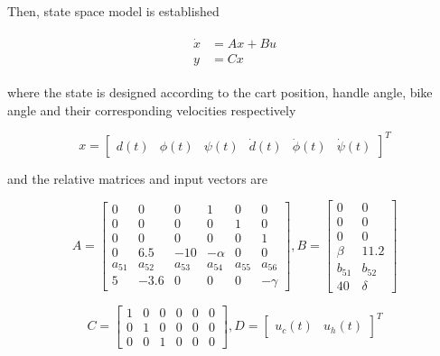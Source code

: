 \documentclass[hyperref]{article}
\theoremstyle{nonumberplain}
\begin{document}
	Then, state space model is established
	
	\begin{equation}
	\begin{split}
	\begin{aligned}
		\dot{x}&=Ax+Bu \\
		y&=Cx
	\label{eq1}
	\end{aligned}
	\end{split}
	\end{equation}
	
	where the state is designed according to the cart position, handle angle, bike angle and their corresponding velocities respectively
	
	\begin{equation}
		x=\begin{bmatrix}
		d(t) & \phi(t) & \psi(t) & \dot{d}(t) & \dot{\phi}(t) & \dot{\psi}(t) 
		\end{bmatrix}^{T}
	\label{eq2}
	\end{equation}
	
	and the relative matrices and input vectors are
	
	\begin{equation}
		A=\begin{bmatrix}
		0 &0  &0  &1  &0  &0 \\ 
		0 &0  &0  &0  &1  &0 \\ 
		0 &0  &0  &0  &0  &1 \\ 
		0 &6.5  &-10  &-\alpha   &0  &0 \\ 
		a_{51} &a_{52}  &a_{53}  &a_{54}  &a_{55}  &a_{56} \\ 
		5 &-3.6  &0  &0  &0  &-\gamma  
		\end{bmatrix}, 
		B=\begin{bmatrix}
		0 &0 \\ 
		0 &0 \\ 
		0 &0 \\ 
		\beta  &11.2 \\ 
		b_{51} &b_{52} \\ 
		40 &\delta  
		\end{bmatrix}
	\label{eq3}
	\end{equation}
	
	\begin{equation}
		C=\begin{bmatrix}
		1 &0  &0  &0  &0  &0 \\ 
		0 &1  &0  &0  &0  &0 \\ 
		0 &0  &1  &0  &0  &0 
		\end{bmatrix},
		D=\begin{bmatrix}
		u_{c}(t) &u_{h}(t) 
		\end{bmatrix}^{T}
	\label{eq4}
	\end{equation}
	
\end{document}
